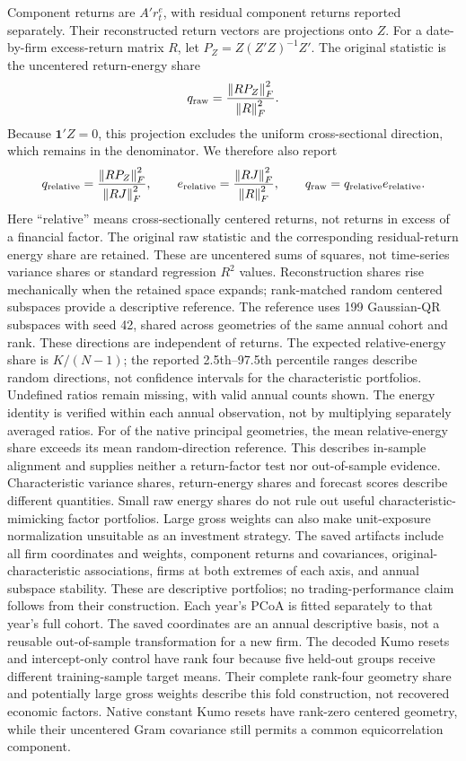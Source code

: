 \documentclass[11pt]{article}
\begin{document}
Component returns are $A'r_t^e$, with residual component returns reported
separately. Their reconstructed return vectors are projections onto $Z$.
For a date-by-firm excess-return matrix $R$, let
$P_Z=Z{(Z'Z)}^{-1}Z'$. The original statistic is the uncentered return-energy
share
\[
  q_{\mathrm{raw}}=\frac{\left\lVert RP_Z\right\rVert_F^2}{\left\lVert R\right\rVert_F^2}.
\]
Because $\mathbf1'Z=0$, this projection excludes the uniform cross-sectional
direction, which remains in the denominator. We therefore also report
\[
  q_{\mathrm{relative}}=
  \frac{\left\lVert RP_Z\right\rVert_F^2}{\left\lVert RJ\right\rVert_F^2},\qquad
  e_{\mathrm{relative}}=\frac{\left\lVert RJ\right\rVert_F^2}{\left\lVert R\right\rVert_F^2},\qquad
  q_{\mathrm{raw}}=q_{\mathrm{relative}}e_{\mathrm{relative}}.
\]
Here ``relative'' means cross-sectionally centered returns, not returns in
excess of a financial factor. The original raw statistic and the corresponding
residual-return energy share are retained. These are uncentered sums of squares,
not time-series variance shares or standard regression $R^2$ values.
Reconstruction shares rise mechanically when the retained space expands;
rank-matched random centered subspaces provide a descriptive reference.
The reference uses 199 Gaussian-QR subspaces with seed 42, shared across
geometries of the same annual cohort and rank. These directions are independent
of returns. The expected relative-energy share is $K/(N-1)$; the reported
2.5th--97.5th percentile ranges describe random directions, not confidence
intervals for the characteristic portfolios. Undefined ratios remain missing,
with valid annual counts shown. The energy identity is verified within each
annual observation, not by multiplying separately averaged ratios.
For \PcoaNativeAboveRandom{} of the \PcoaNativeCount{} native principal
geometries, the mean relative-energy share exceeds its mean random-direction
reference. This describes in-sample alignment and supplies neither a
return-factor test nor out-of-sample evidence.
Characteristic variance shares, return-energy shares and forecast scores
describe different quantities. Small raw energy shares do not rule out useful
characteristic-mimicking factor portfolios. Large gross weights can also
make unit-exposure normalization unsuitable as an investment strategy.
The saved artifacts include all firm coordinates and weights, component returns
and covariances, original-characteristic associations, firms at both extremes
of each axis, and annual subspace stability. These are descriptive portfolios;
no trading-performance claim follows from their construction.
Each year's PCoA is fitted separately to that year's full cohort. The saved
coordinates are an annual descriptive basis, not a reusable out-of-sample
transformation for a new firm.
The decoded Kumo resets and intercept-only control have rank four because five
held-out groups receive different training-sample target means. Their complete
rank-four geometry share and potentially large gross weights describe this
fold construction, not recovered economic factors. Native constant Kumo resets
have rank-zero centered geometry, while their uncentered Gram covariance still
permits a common equicorrelation component.
\end{document}
